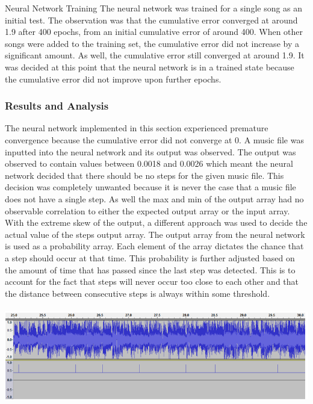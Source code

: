 Neural Network Training
The neural network was trained for a single song as an initial test. The observation was that the cumulative error converged at around 1.9 after 400 epochs, from an initial cumulative error of around 400. When other songs were added to the training set, the cumulative error did not increase by a significant amount. As well, the cumulative error still converged at around 1.9. It was decided at this point that the neural network is in a trained state because the cumulative error did not improve upon further epochs. \\

\subsubsection{Results and Analysis}
The neural network implemented in this section experienced premature convergence because the cumulative error did not converge at 0. A music file was inputted into the neural network and its output was observed. The output was observed to contain values between 0.0018 and 0.0026 which meant the neural network decided that there should be no steps for the given music file. This decision was completely unwanted because it is never the case that a music file does not have a single step. As well the max and min of the output array had no observable correlation to either the expected output array or the input array.\\

With the extreme skew of the output, a different approach was used to decide the actual value of the steps output array. The output array from the neural network is used as a probability array. Each element of the array dictates the chance that a step should occur at that time. This probability is further adjusted based on the amount of time that has passed since the last step was detected. This is to account for the fact that steps will never occur too close to each other and that the distance between consecutive steps is always within some threshold.\\\\

\includegraphics[scale=0.3]{signal_2.png}

